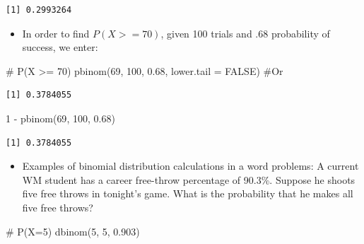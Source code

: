 \documentclass[
  letterpaper,
  DIV=11,
  numbers=noendperiod]{scrreprt}
\newenvironment{Shaded}{\begin{snugshade}}{\end{snugshade}}
\newcommand{\AttributeTok}[1]{\textcolor[rgb]{0.40,0.45,0.13}{#1}}
\newcommand{\CommentTok}[1]{\textcolor[rgb]{0.37,0.37,0.37}{#1}}
\newcommand{\ConstantTok}[1]{\textcolor[rgb]{0.56,0.35,0.01}{#1}}
\newcommand{\DecValTok}[1]{\textcolor[rgb]{0.68,0.00,0.00}{#1}}
\newcommand{\FloatTok}[1]{\textcolor[rgb]{0.68,0.00,0.00}{#1}}
\newcommand{\FunctionTok}[1]{\textcolor[rgb]{0.28,0.35,0.67}{#1}}
\newcommand{\NormalTok}[1]{\textcolor[rgb]{0.00,0.23,0.31}{#1}}
\newcommand{\SpecialCharTok}[1]{\textcolor[rgb]{0.37,0.37,0.37}{#1}}
\providecommand{\tightlist}{%
  \setlength{\itemsep}{0pt}\setlength{\parskip}{0pt}}\usepackage{longtable,booktabs,array}
\begin{document}
\begin{verbatim}
[1] 0.2993264
\end{verbatim}

\begin{itemize}
\tightlist
\item
  In order to find \(P(X >= 70)\), given 100 trials and .68 probability
  of success, we enter:
\end{itemize}

\begin{Shaded}
\begin{Highlighting}[]
\CommentTok{\# P(X \textgreater{}= 70)}
\FunctionTok{pbinom}\NormalTok{(}\DecValTok{69}\NormalTok{, }\DecValTok{100}\NormalTok{, }\FloatTok{0.68}\NormalTok{, }\AttributeTok{lower.tail =} \ConstantTok{FALSE}\NormalTok{)  }\CommentTok{\#Or}
\end{Highlighting}
\end{Shaded}

\begin{verbatim}
[1] 0.3784055
\end{verbatim}

\begin{Shaded}
\begin{Highlighting}[]
\DecValTok{1} \SpecialCharTok{{-}} \FunctionTok{pbinom}\NormalTok{(}\DecValTok{69}\NormalTok{, }\DecValTok{100}\NormalTok{, }\FloatTok{0.68}\NormalTok{)}
\end{Highlighting}
\end{Shaded}

\begin{verbatim}
[1] 0.3784055
\end{verbatim}

\begin{itemize}
\tightlist
\item
  Examples of binomial distribution calculations in a word problems: A
  current WM student has a career free-throw percentage of 90.3\%.
  Suppose he shoots five free throws in tonight's game. What is the
  probability that he makes all five free throws?
\end{itemize}

\begin{Shaded}
\begin{Highlighting}[]
\CommentTok{\# P(X=5)}
\FunctionTok{dbinom}\NormalTok{(}\DecValTok{5}\NormalTok{, }\DecValTok{5}\NormalTok{, }\FloatTok{0.903}\NormalTok{)}
\end{Highlighting}
\end{Shaded}
\end{document}
